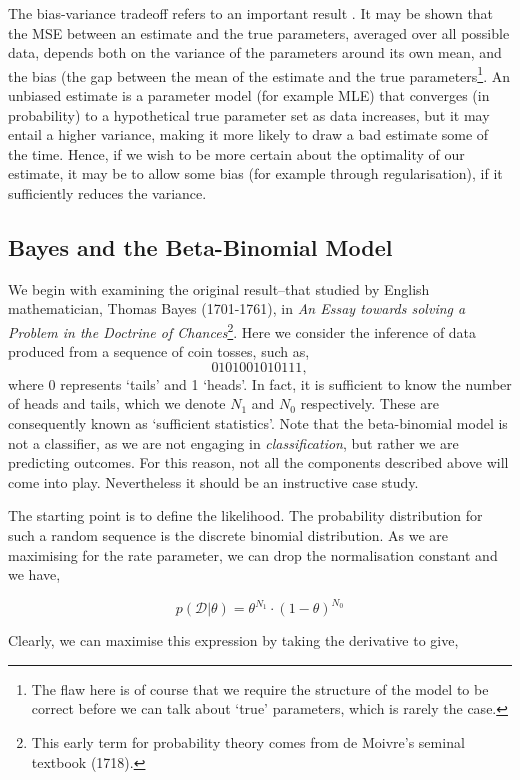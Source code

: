 \documentclass[11pt]{amsart}
\begin{document}
The bias-variance tradeoff refers to an important result . It may be shown that the MSE between an estimate and the true parameters, averaged over all possible data, depends both on the variance of the parameters around its own mean, and the bias (the gap between the mean of the estimate and the true parameters\footnote{The flaw here is of course that we require the structure of the model to be correct before we can talk about `true' parameters, which is rarely the case.}. An unbiased estimate is a parameter model (for example MLE) that converges (in probability) to a hypothetical true parameter set as data increases, but it may entail a higher variance, making it more likely to draw a bad estimate some of the time. Hence, if we wish to be more certain about the optimality of our estimate, it may be to allow some bias (for example through regularisation), if it sufficiently reduces the variance.

\subsection{Bayes and the Beta-Binomial Model}

We begin with examining the original result--that studied by English mathematician, Thomas Bayes (1701-1761), in \emph{An Essay towards solving a Problem in the Doctrine of Chances}\footnote{This early term for probability theory comes from de Moivre's seminal textbook (1718).}. Here we consider the inference of data produced from a sequence of coin tosses, such as, $$0101001010111,$$ where $0$ represents `tails' and 1 `heads'. In fact, it is sufficient to know the number of heads and tails, which we denote $N_1$ and $N_0$ respectively. These are consequently known as `sufficient statistics'. Note that the beta-binomial model is not a classifier, as we are not engaging in \emph{classification}, but rather we are predicting outcomes. For this reason, not all the components described above will come into play. Nevertheless it should be an instructive case study.

The starting point is to define the likelihood. The probability distribution for such a random sequence is the discrete binomial distribution. As we are maximising for the rate parameter, we can drop the normalisation constant and we have,

$$p(\mathcal{D}|\theta) = \theta^{N_1}\cdot(1 - \theta)^{N_0}$$

Clearly, we can maximise this expression by taking the derivative to give,
\end{document}

